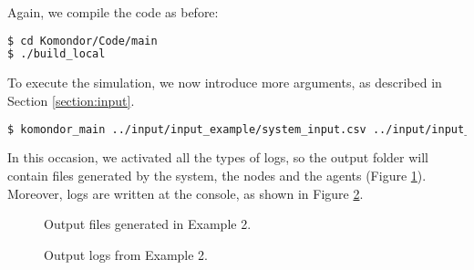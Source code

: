 \documentclass[a4paper]{article}
\begin{document}
Again, we compile the code as before:
\begin{lstlisting}[language=bash,caption={Compling the code}]
$ cd Komondor/Code/main
$ ./build_local
\end{lstlisting}

To execute the simulation, we now introduce more arguments, as described in Section \ref{section:input}.
\begin{lstlisting}[language=bash,caption={Executing the code}]
$ komondor_main ../input/input_example/system_input.csv ../input/input_example/nodes_input.csv ../input/input_example/agents.csv 1 1 1 1 1 1 120 432
\end{lstlisting}

In this occasion, we activated all the types of logs, so the output folder will contain files generated by the system, the nodes and the agents (Figure \ref{fig:output_folder}). Moreover, logs are written at the console, as shown in Figure \ref{fig:example_2_console_output}.

\begin{figure}[h!]
	\centering
	\caption{Output files generated in Example 2.}
	\label{fig:output_folder}
\end{figure}

\begin{figure}[h!]
	\centering
	\caption{Output logs from Example 2.}
	\label{fig:example_2_console_output}
\end{figure}



\end{document}
